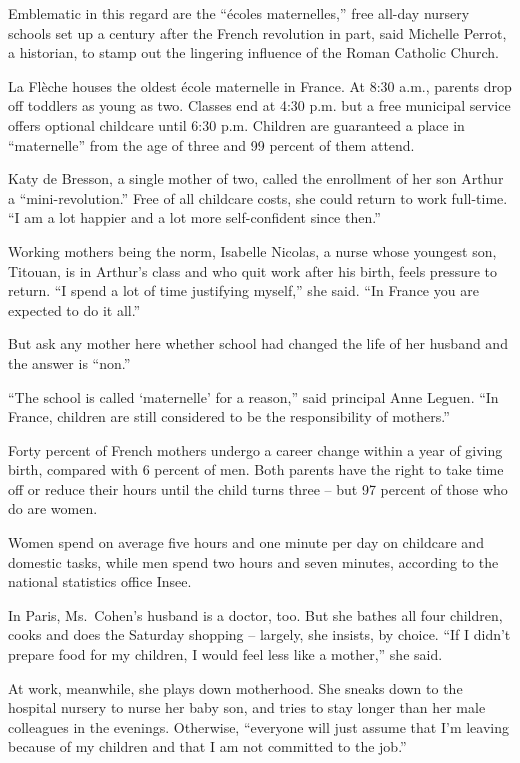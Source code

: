 ﻿\documentclass[12pt]{article}
\begin{document}
Emblematic in this regard are the ``\'ecoles maternelles,'' free all-day nursery schools set up a
century after the French revolution in part, said Michelle Perrot, a historian, to stamp out the
lingering influence of the Roman Catholic Church.

La Fl\`eche houses the oldest \'ecole maternelle in France. At 8:30 a.m., parents drop off toddlers
as young as two. Classes end at 4:30 p.m. but a free municipal service offers optional childcare
until 6:30 p.m. Children are guaranteed a place in ``maternelle'' from the age of three and 99
percent of them attend.

Katy de Bresson, a single mother of two, called the enrollment of her son Arthur a
``mini-revolution.'' Free of all childcare costs, she could return to work full-time. ``I am a lot
happier and a lot more self-confident since then.''

Working mothers being the norm, Isabelle Nicolas, a nurse whose youngest son, Titouan, is in
Arthur's class and who quit work after his birth, feels pressure to return. ``I spend a lot of time
justifying myself,'' she said. ``In France you are expected to do it all.''

But ask any mother here whether school had changed the life of her husband and the answer is
``non.''

``The school is called `maternelle' for a reason,'' said principal Anne Leguen. ``In France,
children are still considered to be the responsibility of mothers.''

Forty percent of French mothers undergo a career change within a year of giving birth, compared with
6 percent of men. Both parents have the right to take time off or reduce their hours until the child
turns three -- but 97 percent of those who do are women.

Women spend on average five hours and one minute per day on childcare and domestic tasks, while men
spend two hours and seven minutes, according to the national statistics office Insee.

In Paris, Ms.~Cohen's husband is a doctor, too. But she bathes all four children, cooks and does the
Saturday shopping -- largely, she insists, by choice. ``If I didn't prepare food for my children, I
would feel less like a mother,'' she said.

At work, meanwhile, she plays down motherhood. She sneaks down to the hospital nursery to nurse her
baby son, and tries to stay longer than her male colleagues in the evenings. Otherwise, ``everyone
will just assume that I'm leaving because of my children and that I am not committed to the job.''
\end{document}
